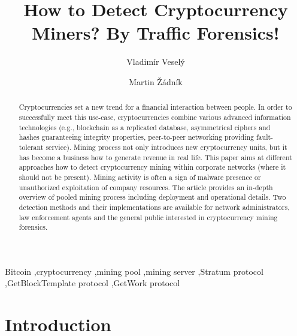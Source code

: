 \documentclass[preprint,12pt,3p]{elsarticle}
\begin{document}
\begin{frontmatter}

\title{How to Detect Cryptocurrency Miners? By Traffic Forensics!}

\author[label1]{Vladimír Veselý}

\author[label1]{Martin Žádník}

\address[label1]{Brno University of Technology, Božetěchova 2, Brno 612 66, Czech Republic}

\begin{abstract}
Cryptocurrencies set a new trend for a financial interaction between people. In order to successfully meet this use-case, cryptocurrencies combine various advanced information technologies (e.g., blockchain as a replicated database, asymmetrical ciphers and hashes guaranteeing integrity properties, peer-to-peer networking providing fault-tolerant service). Mining process not only introduces new cryptocurrency units, but it has become a business how to generate revenue in real life.
This paper aims at different approaches how to detect cryptocurrency mining within corporate networks (where it should not be present). Mining activity is often a sign of malware presence or unauthorized exploitation of company resources. The article provides an in-depth overview of pooled mining process including deployment and operational details. Two detection methods and their implementations are available for network administrators, law enforcement agents and the general public interested in cryptocurrency mining forensics.    
\end{abstract}

\begin{keyword}
Bitcoin \sep cryptocurrency \sep mining pool \sep mining server \sep Stratum protocol \sep GetBlockTemplate protocol \sep GetWork protocol
\end{keyword}

\end{frontmatter}



\section{Introduction}
\label{sec1}
\end{document}
